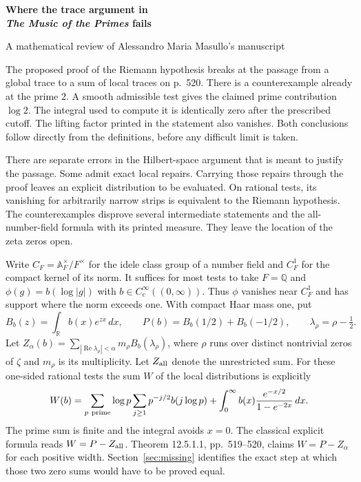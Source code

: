 \documentclass[11pt,letterpaper]{article}
\newcommand{\R}{\mathbb R}
\newcommand{\Q}{\mathbb Q}
\newcommand{\A}{\mathbb A}
\newcommand{\Rea}{\operatorname{Re}}
\newcommand{\dd}{\,d}
\newcommand{\step}[1]{\par\smallskip{\color{ink}\bfseries #1}\enspace}
\begin{document}
\thispagestyle{plain}
{\color{ink}\LARGE\bfseries Where the trace argument in\\[3pt]
\textit{The Music of the Primes} fails\par}
\smallskip
{\large A mathematical review of Alessandro Maria Masullo's manuscript\par}
\medskip

The proposed proof of the Riemann hypothesis breaks at the passage from a global trace to a sum of local traces on p.~520. There is a counterexample already at the prime \(2\). A smooth admissible test gives the claimed prime contribution \(\log 2\). The integral used to compute it is identically zero after the prescribed cutoff. The lifting factor printed in the statement also vanishes. Both conclusions follow directly from the definitions, before any difficult limit is taken.

There are separate errors in the Hilbert-space argument that is meant to justify the passage. Some admit exact local repairs. Carrying those repairs through the proof leaves an explicit distribution to be evaluated. On rational tests, its vanishing for arbitrarily narrow strips is equivalent to the Riemann hypothesis. The counterexamples disprove several intermediate statements and the all-number-field formula with its printed measure. They leave the location of the zeta zeros open.

\step{The proposed identity.}
Write \(C_F=\A_F^\times/F^\times\) for the idele class group of a number field and \(C_F^1\) for the compact kernel of its norm. It suffices for most tests to take \(F=\Q\) and \(\phi(g)=b(\log|g|)\) with \(b\in C_c^\infty((0,\infty))\). Thus \(\phi\) vanishes near \(C_F^1\) and has support where the norm exceeds one. With compact Haar mass one, put
\[
 B_b(z)=\int_\R b(x)e^{zx}\dd x,\qquad
 P(b)=B_b(1/2)+B_b(-1/2),\qquad \lambda_\rho=\rho-\tfrac12 .
\]
Let \(Z_\alpha(b)=\sum_{|\Rea\lambda_\rho|<\alpha}m_\rho B_b(\lambda_\rho)\), where \(\rho\) runs over distinct nontrivial zeros of \(\zeta\) and \(m_\rho\) is its multiplicity. Let \(Z_{\rm all}\) denote the unrestricted sum. For these one-sided rational tests the sum \(W\) of the local distributions is explicitly
\[
 W(b)=\sum_{p\ {\rm prime}}\log p\sum_{j\ge1}p^{-j/2}b(j\log p)
       +\int_0^\infty b(x)\frac{e^{-x/2}}{1-e^{-2x}}\dd x.
\]
The prime sum is finite and the integral avoids \(x=0\). The classical explicit formula reads \(W=P-Z_{\rm all}\). Theorem 12.5.1.1, pp.~519--520, claims \(W=P-Z_\alpha\) for each positive width. Section~\ref{sec:missing} identifies the exact step at which those two zero sums would have to be proved equal.
\end{document}
